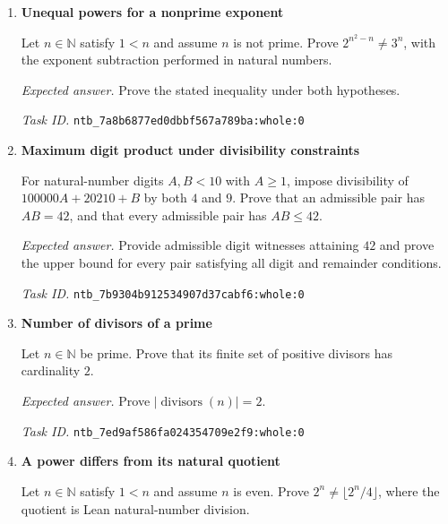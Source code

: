 \documentclass[11pt]{article}
\newcommand{\pth}[1]{\nolinkurl{#1}}
\begin{document}
\begin{enumerate}[label={TEST \arabic*.},leftmargin=4.5em,itemsep=1em]
Prove two claims about natural numbers. First, there exist $n>0$ and a prime $p$ such that $p\nmid(5n)!$, $p\mid (5n+1)!+(5n+2)!$, and $p\bmod5=1$. Second, every positive $n$ and prime $p$ satisfying those two divisibility conditions has $p\bmod5\ge1$.

\emph{Expected answer.} Supply witnesses for the existence claim and prove the universal remainder bound. Both conjuncts require complete Lean proofs.

\emph{Task ID.} \pth{ntb_7a12343ef5f6b7715d2b8dd7:whole:0}

\item \textbf{Unequal powers for a nonprime exponent}\label{qn:test:43}

Let $n\in\mathbb N$ satisfy $1<n$ and assume $n$ is not prime. Prove $2^{n^2-n}\ne3^n$, with the exponent subtraction performed in natural numbers.

\emph{Expected answer.} Prove the stated inequality under both hypotheses.

\emph{Task ID.} \pth{ntb_7a8b6877ed0dbbf567a789ba:whole:0}

\item \textbf{Maximum digit product under divisibility constraints}\label{qn:test:44}

For natural-number digits $A,B<10$ with $A\ge1$, impose divisibility of $100000A+20210+B$ by both $4$ and $9$. Prove that an admissible pair has $AB=42$, and that every admissible pair has $AB\le42$.

\emph{Expected answer.} Provide admissible digit witnesses attaining $42$ and prove the upper bound for every pair satisfying all digit and remainder conditions.

\emph{Task ID.} \pth{ntb_7b9304b912534907d37cabf6:whole:0}

\item \textbf{Number of divisors of a prime}\label{qn:test:45}

Let $n\in\mathbb N$ be prime. Prove that its finite set of positive divisors has cardinality $2$.

\emph{Expected answer.} Prove $\lvert\operatorname{divisors}(n)\rvert=2$.

\emph{Task ID.} \pth{ntb_7ed9af586fa024354709e2f9:whole:0}

\item \textbf{A power differs from its natural quotient}\label{qn:test:46}

Let $n\in\mathbb N$ satisfy $1<n$ and assume $n$ is even. Prove $2^n\ne\lfloor2^n/4\rfloor$, where the quotient is Lean natural-number division.


\end{enumerate}
\end{document}
